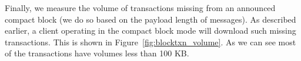 Finally, we measure the volume of transactions missing from an announced compact block (we do so based on the payload length of  messages).
As described earlier,  a \bc client operating in the compact block mode will download such missing transactions.
This is shown in Figure~\ref{fig:blocktxn_volume}. 
As we can see most of the transactions have volumes less than 100 KB. 

